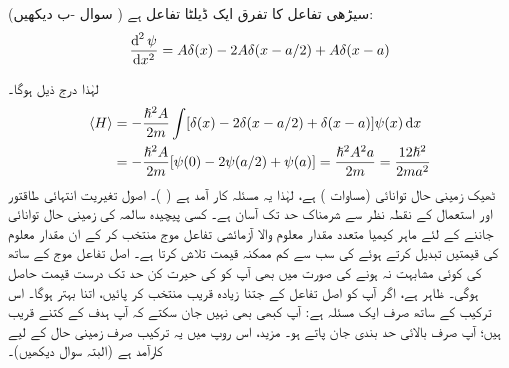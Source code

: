  

 سیڑھی تفاعل کا تفرق ایک ڈیلٹا تفاعل ہے ( سوال -ب دیکھیں):
\begin{align}
\frac{\dif^{\,2}{\psi}}{\dif{x^{2}}}=A\delta(x)-2A\delta(x-a/2)+A\delta(x-a)
\end{align}

 لہٰذا درج ذیل ہوگا۔
\begin{align} 
\langle H \rangle &= -\frac{\hslash^{2}A}{2m}\int[\delta(x)-2\delta(x-a/2)+\delta(x-a)]\psi(x)\dif{x}\nonumber\\
&= -\frac{\hslash^{2}A}{2m}[\psi(0)-2\psi(a/2)+\psi(a)]=\frac{\hslash^{2}A^{2}a}{2m}=\frac{12\hslash^{2}}{2ma^{2}}
\end{align}
 ٹھیک زمینی حال توانائی  (مساوات ) ہے، لہٰذا یہ مسئلہ کار آمد ہے ( )۔
اصول تغیریت انتہائی طاقتور اور استعمال کے نقطہ نظر سے شرمناک حد تک آسان ہے۔ کسی پیچیدہ سالمہ کی زمینی حال توانائی جاننے کے لئے ماہر کیمیا متعدد مقدار معلوم والا آزمائشی تفاعل موج منتخب کر کے ان مقدار معلوم کی قیمتیں تبدیل کرتے ہوئے  کی سب سے کم ممکنہ قیمت تلاش کرتا ہے۔ اصل تفاعل موج کے ساتھ  کی کوئی مشابہت نہ ہونے کی صورت میں بھی آپ کو  کی حیرت کن حد تک درست قیمت حاصل ہوگی۔ ظاہر ہے، اگر آپ  کو اصل تفاعل کے جتنا زیادہ قریب منتخب کر پائیں، اتنا بہتر ہوگا۔ اس ترکیب کے ساتھ صرف ایک مسئلہ ہے: آپ کبھی بھی نہیں جان سکتے کہ آپ ہدف کے کتنے قریب ہیں؛ آپ صرف بالائی حد بندی جان پاتے ہو۔ مزید، اس روپ میں یہ ترکیب صرف زمینی حال کے لیے کارآمد ہے (البتہ سوال  دیکھیں)۔

